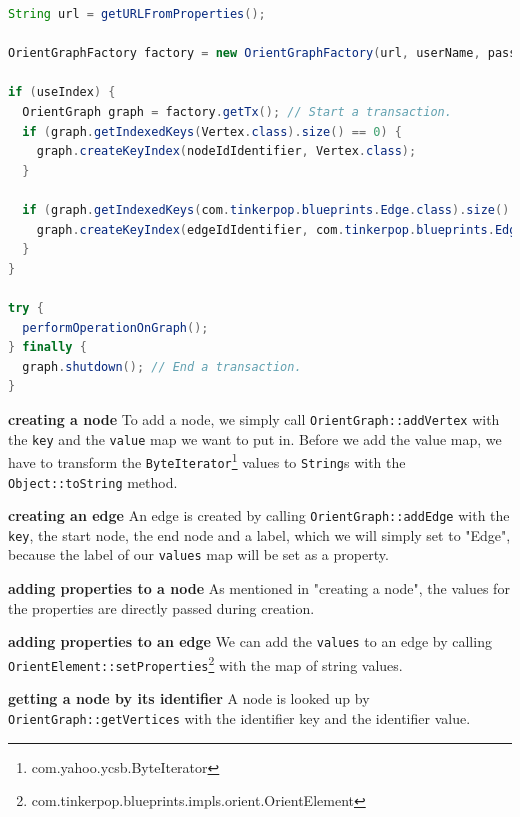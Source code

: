 \begin{lstlisting}[language=Java,label={lst:orientdbInit},caption={Implementation of the initialisation and the retrieval of an \texttt{OrientGraph} for a transaction.},captionpos=b]
String url = getURLFromProperties();

OrientGraphFactory factory = new OrientGraphFactory(url, userName, password); // Create object to access database.

if (useIndex) {
  OrientGraph graph = factory.getTx(); // Start a transaction.
  if (graph.getIndexedKeys(Vertex.class).size() == 0) {
    graph.createKeyIndex(nodeIdIdentifier, Vertex.class);
  }

  if (graph.getIndexedKeys(com.tinkerpop.blueprints.Edge.class).size() == 0) {
    graph.createKeyIndex(edgeIdIdentifier, com.tinkerpop.blueprints.Edge.class);
  }
}

try {
  performOperationOnGraph();
} finally {
  graph.shutdown(); // End a transaction.
}
\end{lstlisting}

\textbf{creating a node} \newline
To add a node,
we simply call \texttt{OrientGraph::addVertex} with the \texttt{key} and the \texttt{value} map we want to put in.
Before we add the value map,
we have to transform the \texttt{ByteIterator}\footnote{com.yahoo.ycsb.ByteIterator} values to \texttt{String}s with the \texttt{Object::toString} method.

\textbf{creating an edge} \newline
An edge is created by calling \texttt{OrientGraph::addEdge} with the \texttt{key},
the start node,
the end node and a label,
which we will simply set to "Edge",
because the label of our \texttt{values} map will be set as a property.

\textbf{adding properties to a node} \newline
As mentioned in "creating a node",
the values for the properties are directly passed during creation.

\textbf{adding properties to an edge} \newline
We can add the \texttt{values} to an edge by calling \texttt{OrientElement::setProperties}\footnote{com.tinkerpop.blueprints.impls.orient.OrientElement} with the map of string values.

\textbf{getting a node by its identifier} \newline
A node is looked up by \texttt{OrientGraph::getVertices} with the identifier key and the identifier value.

